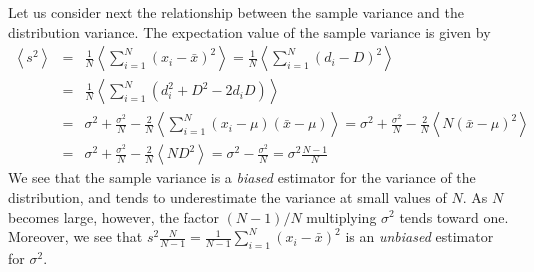 \documentclass{revtex4}
\begin{document}
Let us consider next the relationship between the sample variance and
the distribution variance. The
expectation value of the sample variance is given by
\begin{eqnarray}
  \left<s^2 \right> &=& \frac{1}{N} \left<\sum_{i=1}^N (x_i -
    \bar{x})^2 \right> = \frac{1}{N} \left<\sum_{i=1}^N (d_i -D)^2
  \right> \nonumber \\
  &=& \frac{1}{N} \left<\sum_{i=1}^N \left( d_i^2 + D^2 - 2d_i D
    \right)\right> \nonumber \\
  &=& \sigma^2 + \frac{\sigma^2}{N} - \frac{2}{N} \left<\sum_{i=1}^N
    (x_i-\mu)(\bar{x}-\mu)\right> = \sigma^2 + \frac{\sigma^2}{N} -
  \frac{2}{N} \left<N (\bar{x}-\mu)^2 \right> \nonumber \\
  &=& \sigma^2 + \frac{\sigma^2}{N} - \frac{2}{N}\left<N D^2 \right> =
  \sigma^2 - \frac{\sigma^2}{N} = \sigma^2 \frac{N-1}{N} 
\end{eqnarray}
We see that the sample variance is a \emph{biased} estimator for the
variance of the distribution, and tends to underestimate the variance
at small values of $N$. As $N$ becomes large, however, the factor
$(N-1)/N$ multiplying $\sigma^2$ tends toward one. Moreover, we see
that $s^2 \frac{N}{N-1} = \frac{1}{N-1}\sum_{i=1}^N (x_i - \bar{x})^2$
is an \emph{unbiased} estimator for $\sigma^2$.
\end{document}
